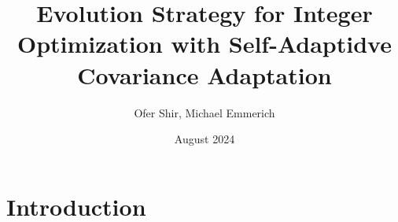 \documentclass{article}
\title{Evolution Strategy for Integer Optimization with Self-Adaptidve Covariance Adaptation }
\author{Ofer Shir, Michael Emmerich}
\date{August 2024}
\begin{document}
\maketitle

\section{Introduction}
\end{document}
